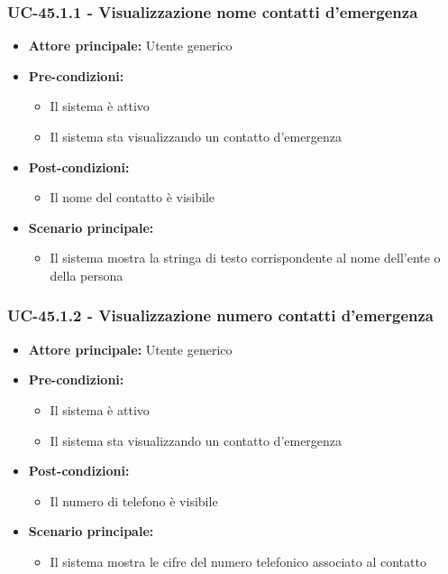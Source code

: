 \documentclass[a4paper,12pt]{article}
\begin{document}
\subsubsection{UC-45.1.1 - Visualizzazione nome contatti d'emergenza} \label{subsec:UC-45.1.1}
\begin{itemize}
    \item \textbf{Attore principale:} Utente generico
    \item \textbf{Pre-condizioni:} 
    \begin{itemize}
        \item Il sistema è attivo
        \item Il sistema sta visualizzando un contatto d'emergenza
    \end{itemize}
    \item \textbf{Post-condizioni:}
    \begin{itemize}
        \item Il nome del contatto è visibile
    \end{itemize}
    \item \textbf{Scenario principale:} 
    \begin{itemize}
        \item Il sistema mostra la stringa di testo corrispondente al nome dell'ente o della persona
    \end{itemize}
\end{itemize}

\subsubsection{UC-45.1.2 - Visualizzazione numero contatti d'emergenza} \label{subsec:UC-45.1.2}
\begin{itemize}
    \item \textbf{Attore principale:} Utente generico
    \item \textbf{Pre-condizioni:} 
    \begin{itemize}
        \item Il sistema è attivo
        \item Il sistema sta visualizzando un contatto d'emergenza
    \end{itemize}
    \item \textbf{Post-condizioni:}
    \begin{itemize}
        \item Il numero di telefono è visibile
    \end{itemize}
    \item \textbf{Scenario principale:} 
    \begin{itemize}
        \item Il sistema mostra le cifre del numero telefonico associato al contatto
    \end{itemize}
\end{itemize}
\end{document}
